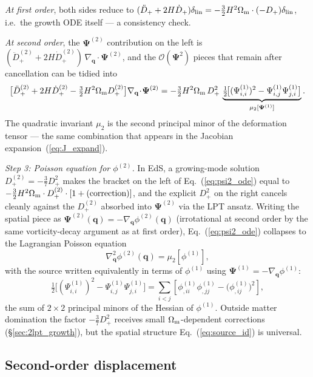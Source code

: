 \documentclass[12pt]{article}
\newcommand{\bq}{\mathbf{q}}
\newcommand{\bPsi}{\boldsymbol{\Psi}}
\newcommand{\Dp}{D_+}
\newcommand{\Dpp}{D_+^{(2)}}
\newcommand{\Omm}{\Omega_{\rm m}}
\begin{document}
\emph{At first order}, both sides reduce to
$(\ddot\Dp+2H\dot\Dp)\delta_{\rm lin} = -\tfrac{3}{2}H^2\Omm\cdot(-\Dp)\delta_{\rm lin}$,
i.e.\ the growth ODE itself --- a consistency check.

\emph{At second order}, the $\bPsi^{(2)}$ contribution on the left is
$(\ddot\Dpp + 2H\dot\Dpp)\,\nabla_\bq\cdot\bPsi^{(2)}$, and the
$\mathcal{O}(\bPsi^2)$ pieces that remain after cancellation can be
tidied into
%
\begin{equation}
  \bigl[\ddot\Dpp + 2H\dot\Dpp - \tfrac{3}{2}H^2\Omm\Dpp\bigr]
  \nabla_\bq\!\cdot\!\bPsi^{(2)}
  = -\tfrac{3}{2}H^2\Omm\,\Dp^2\,
  \underbrace{\tfrac{1}{2}\!\bigl[(\Psi^{(1)}_{i,i})^2
    - \Psi^{(1)}_{i,j}\Psi^{(1)}_{j,i}\bigr]}_{\mu_2[\bPsi^{(1)}]}.
  \label{eq:psi2_ode}
\end{equation}
%
The quadratic invariant $\mu_2$ is the second principal minor of the
deformation tensor --- the same combination that appears in the
Jacobian expansion~(\ref{eq:J_expand}).

\emph{Step 3: Poisson equation for $\phi^{(2)}$.}  In EdS, a
growing-mode solution $\Dpp = -\tfrac{3}{7}\Dp^2$ makes the bracket
on the left of Eq.~(\ref{eq:psi2_ode}) equal to $-\tfrac{3}{2}H^2\Omm
\cdot\Dpp\cdot[1+(\text{correction})]$, and the explicit $\Dp^2$ on
the right cancels cleanly against the $\Dpp$ absorbed into
$\bPsi^{(2)}$ via the LPT ansatz.  Writing the spatial piece as
$\bPsi^{(2)}(\bq) = -\nabla_\bq\phi^{(2)}(\bq)$ (irrotational at
second order by the same vorticity-decay argument as at first order),
Eq.~(\ref{eq:psi2_ode}) collapses to the Lagrangian Poisson equation
%
\begin{equation}
  \nabla_\bq^2\phi^{(2)}(\bq) = \mu_2[\phi^{(1)}],
\end{equation}
%
with the source written equivalently in terms of $\phi^{(1)}$ using
$\bPsi^{(1)} = -\nabla_\bq\phi^{(1)}$:
%
\begin{equation}
  \tfrac{1}{2}\bigl[(\Psi^{(1)}_{i,i})^2
    - \Psi^{(1)}_{i,j}\Psi^{(1)}_{j,i}\bigr]
  = \sum_{i<j}
    \left[\phi^{(1)}_{,ii}\phi^{(1)}_{,jj}
          - \bigl(\phi^{(1)}_{,ij}\bigr)^2\right],
  \label{eq:source_id}
\end{equation}
%
the sum of $2\!\times\!2$ principal minors of the Hessian of
$\phi^{(1)}$.  Outside matter domination the factor
$-\tfrac{3}{7}\Dp^2$ receives small $\Omm$-dependent corrections
(\S\ref{sec:2lpt_growth}), but the spatial structure
Eq.~(\ref{eq:source_id}) is universal.

\subsection{Second-order displacement}
\end{document}
